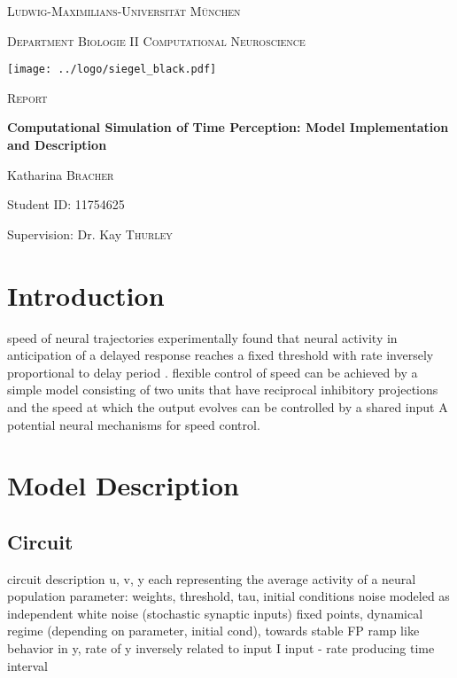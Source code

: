\documentclass[9pt]{article}
\begin{document}

\begin{titlepage}
	\centering
	{\scshape\LARGE Ludwig-Maximilians-Universität München \par}
	{\scshape\large Department Biologie II Computational Neuroscience \par}
	\vspace{0.9cm}
	\texttt{[image: ../logo/siegel\_black.pdf]}\par
	\vspace{1.1cm}
	{\scshape\LARGE Report \par}
	\vspace{0.2cm}
	{\huge\bfseries Computational Simulation of Time Perception: Model Implementation and Description \par}
	\vspace{1.1cm}
	{\Large Katharina \textsc{Bracher} \par}
	{Student ID: 11754625 \par}
	\vspace{0.6cm}
	{\Large Supervision: Dr. Kay \textsc{Thurley} \par}
\end{titlepage}


\normalsize
\tableofcontents

\section{Introduction}
speed of neural trajectories
experimentally found that neural activity in anticipation of a delayed response reaches a fixed threshold with rate inversely proportional to delay period \cite{Wang2018}.
flexible control of speed 
can be achieved by a simple model consisting of two units that have reciprocal inhibitory projections and the speed at which the output evolves can be controlled by a shared input
A potential neural mechanisms for speed control.
\section{Model Description}
\subsection{Circuit}
circuit description
u, v, y each representing the average activity of a neural population
parameter: weights, threshold, tau, initial conditions
noise modeled as independent white noise (stochastic synaptic inputs)
fixed points, dynamical regime (depending on parameter, initial cond), towards stable FP ramp like behavior in y, rate of y inversely related to input I 
input - rate
producing time interval 
\end{document}
